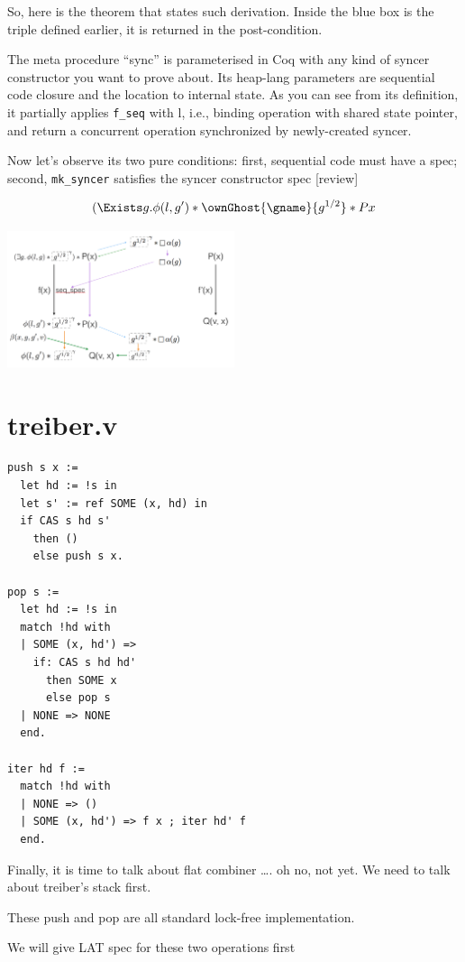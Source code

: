 \documentclass[11pt]{article}
\begin{document}
So, here is the theorem that states such derivation. Inside the blue box is the triple defined earlier, it is returned in the post-condition.

The meta procedure “sync” is parameterised in Coq with any kind of syncer constructor you want to prove about. Its heap-lang parameters are sequential code closure and the location to internal state. As you can see from its definition, it partially applies \texttt{f\_seq} with l, i.e., binding operation with shared state pointer, and return a concurrent operation synchronized by newly-created syncer.

Now let’s observe its two pure conditions: first, sequential code must have a spec; second, \texttt{mk\_syncer} satisfies the syncer constructor spec [review]

\[ (\Exists g. \phi(l, g') * \ownGhost{\gname}{g^{1/2}} * P x \]

\includegraphics[width=0.5\textwidth]{atomic_sync}

\section{treiber.v}

\begin{verbatim}
push s x :=
  let hd := !s in
  let s' := ref SOME (x, hd) in
  if CAS s hd s'
    then ()
    else push s x.

pop s :=
  let hd := !s in
  match !hd with
  | SOME (x, hd') =>
    if: CAS s hd hd'
      then SOME x
      else pop s
  | NONE => NONE
  end.

iter hd f :=
  match !hd with
  | NONE => ()
  | SOME (x, hd') => f x ; iter hd' f
  end.

\end{verbatim}

Finally, it is time to talk about flat combiner …. oh no, not yet. We need to talk about treiber’s stack first.

These push and pop are all standard lock-free implementation.

We will give LAT spec for these two operations first
\end{document}
